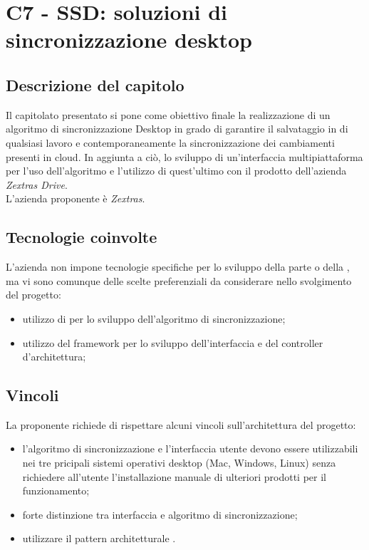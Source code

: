 \section{C7 - SSD: soluzioni di sincronizzazione desktop}

\subsection{Descrizione del capitolo}
Il capitolato presentato si pone come obiettivo finale la realizzazione di un algoritmo di sincronizzazione Desktop in grado di garantire il salvataggio in  di qualsiasi lavoro e contemporaneamente la sincronizzazione dei cambiamenti presenti in cloud. In aggiunta a ciò, lo sviluppo di un'interfaccia multipiattaforma per l'uso dell'algoritmo e l'utilizzo di quest'ultimo con il prodotto dell'azienda \textit{Zextras Drive}.\\
L'azienda proponente è \textit{Zextras}.

\subsection{Tecnologie coinvolte}
L'azienda non impone tecnologie specifiche per lo sviluppo della parte  o della , ma vi sono comunque delle scelte preferenziali da considerare nello svolgimento del progetto:
\begin{itemize}
\item utilizzo di  per lo sviluppo dell'algoritmo di sincronizzazione;
\item utilizzo del framework  per lo sviluppo dell'interfaccia e del controller d'architettura;
\end{itemize}

\subsection{Vincoli}
La proponente richiede di rispettare alcuni vincoli sull'architettura del progetto: 
\begin{itemize}
\item l’algoritmo di sincronizzazione e l’interfaccia utente devono essere utilizzabili nei tre pricipali sistemi operativi desktop (Mac, Windows, Linux) senza richiedere all’utente l’installazione manuale di ulteriori prodotti per il funzionamento; 
\item forte distinzione tra interfaccia e algoritmo di sincronizzazione; 
\item utilizzare il pattern architetturale .
\end{itemize}

